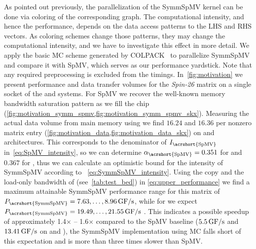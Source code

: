 
As pointed out previously, the parallelization of
the \acrshort{SymmSpMV} kernel can be done
via \DTWO coloring of the corresponding graph. The computational
intensity, and hence the performance, depends on the data access
patterns to the LHS and RHS vectors. As coloring schemes change those
patterns, they may change the computational intensity, and we have to
investigate this effect in more detail. We apply the basic
\acrshort{MC} scheme generated by COLPACK~\cite{COLPACK} to
parallelize \acrshort{SymmSpMV} and compare it with \acrshort{SpMV},
which serves as our performance yardstick. Note that any required
preprocessing is excluded from the timings. In~\cref{fig:motivation}
we present performance and data transfer volumes for
the \emph{Spin-26} matrix on a single socket of the \IVB
and \SKX systems. For \acrshort{SpMV} we recover the well-known memory bandwidth
saturation pattern as we fill the chip (\cref{fig:motivation_symm_spmv,fig:motivation_symm_spmv_skx}).
 Measuring the actual data volume from main memory using \LIKWID
we find $16.24$ and $16.36$ \BYTE per nonzero matrix entry (\cref{fig:motivation_data,fig:motivation_data_skx})
on \IVB and \SKX architectures.
 This corresponds to the denominator of
$I_\mathrm{\acrshort{SpMV}}$ in~\cref{eq:SpMV_intensity}, so we can
determine $\alpha_\mathrm{\acrshort{SpMV}}=0.351$ for \IVB and $0.367$ for \SKX, thus we can calculate an 
optimistic bound for the intensity of \acrshort{SymmSpMV} according to ~\cref{eq:SymmSpMV_intensity}.
 Using the copy and the load-only bandwidth of \IVB (see~\cref{tab:test_bed}) 
 in \cref{eq:upper_performance} we find a maximum
attainable {\acrshort{SymmSpMV}} performance range for this matrix of
$P_\mathrm{\acrshort{SymmSpMV}}=7.63,\ldots,8.96\,\GF$, while for \SKX we expect  $P_\mathrm{\acrshort{SymmSpMV}}=19.49,\ldots,21.55\,\GF$ . This indicates a possible
speedup of approximately 1.4$\times$ -- 1.6$\times$ compared to the \acrshort{SpMV}
baseline ($5.5\,\mbox{GF/s}$ and $13.41\,\mbox{GF/s}$ on \IVB and \SKX), the \acrshort{SymmSpMV} implementation
using \acrshort{MC} falls short of this expectation and is more than
three times slower than \acrshort{SpMV}.
